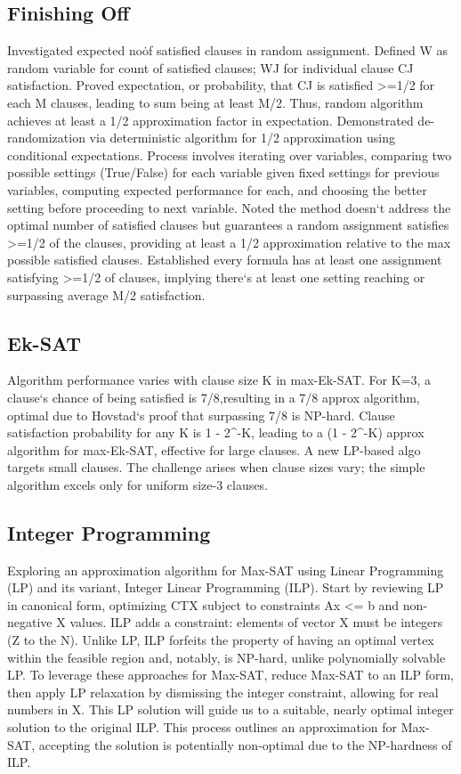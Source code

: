 \subsection*{Finishing Off}
Investigated expected no\. of satisfied clauses in random assignment.
Defined W as random variable for count of satisfied clauses; WJ for individual clause CJ satisfaction.
Proved expectation, or probability, that CJ is satisfied \textgreater{}=1/2 for each M clauses, leading to sum being at least M/2.
Thus, random algorithm achieves at least a 1/2 approximation factor in expectation.
Demonstrated de-randomization via deterministic algorithm for 1/2 approximation using conditional expectations.
Process involves iterating over variables, comparing two possible settings (True/False) for each variable given fixed settings for previous variables, computing expected performance for each, and choosing the better setting before proceeding to next variable.
Noted the method doesn`t address the optimal number of satisfied clauses but guarantees a random assignment satisfies \textgreater{}=1/2 of the clauses, providing at least a 1/2 approximation relative to the max possible satisfied clauses.
Established every formula has at least one assignment satisfying \textgreater{}=1/2 of clauses, implying there`s at least one setting reaching or surpassing average M/2 satisfaction.

\subsection*{Ek-SAT}
Algorithm performance varies with clause size K in max-Ek-SAT\@.
For K=3, a clause`s chance of being satisfied is 7/8,resulting in a 7/8 approx algorithm, optimal due to Hovstad`s proof that surpassing 7/8 is NP-hard.
Clause satisfaction probability for any K is 1 - 2\textasciicircum{}-K, leading to a (1 - 2\textasciicircum{}-K) approx algorithm for max-Ek-SAT, effective for large clauses.
A new LP-based algo targets small clauses.
The challenge arises when clause sizes vary; the simple algorithm excels only for uniform size-3 clauses.

\subsection*{Integer Programming}
Exploring an approximation algorithm for Max-SAT using Linear Programming (LP) and its variant, Integer Linear Programming (ILP).
Start by reviewing LP in canonical form, optimizing CTX subject to constraints Ax \textless{}= b and non-negative X values.
ILP adds a constraint: elements of vector X must be integers (Z to the N).
Unlike LP, ILP forfeits the property of having an optimal vertex within the feasible region and, notably, is NP-hard, unlike polynomially solvable LP\@.
To leverage these approaches for Max-SAT, reduce Max-SAT to an ILP form, then apply LP relaxation by dismissing the integer constraint, allowing for real numbers in X\@.
This LP solution will guide us to a suitable, nearly optimal integer solution to the original ILP\@.
This process outlines an approximation for Max-SAT, accepting the solution is potentially non-optimal due to the NP-hardness of ILP\@.

